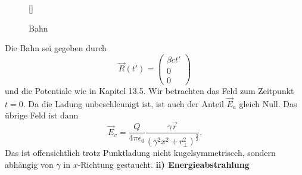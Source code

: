 \begin{wrapfigure}[10]{r}[0cm]{0cm}
	\raisebox{0pt}[\dimexpr{}\baselineskip\relax]{
		\colorbox{hgrey}{
		}
	}
	\caption{Bahn}
\end{wrapfigure}
Die Bahn sei gegeben durch
\begin{equation*}
\vec{R}(t')=\begin{pmatrix}
\beta ct' \\ 0 \\ 0
\end{pmatrix}
\end{equation*}
und die Potentiale wie in Kapitel 13.5. Wir betrachten das Feld zum Zeitpunkt $t=0$. Da die Ladung unbeschleunigt ist, ist auch der Anteil $\vec{E}_a$ gleich Null. Das übrige Feld ist dann
\begin{equation*}
\vec{E}_v = \frac{Q}{4\pi\epsilon_0}\frac{\gamma\vec{r}}{(\gamma^2x^2+r_\perp^2)^\frac{3}{2}}.
\end{equation*}
Das ist offensichtlich trotz Punktladung nicht kugelsymmetriscch, sondern abhängig von $\gamma$ in $x$-Richtung gestaucht.
\newpage
\textbf{ii) \quad Energieabstrahlung}\\

